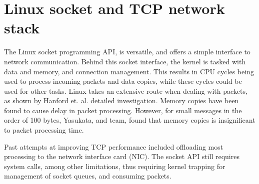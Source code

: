 \section[Linux scoket and TCP]{Linux socket and TCP network stack}\label{sec:linux-socket}
The Linux socket programming API, is versatile, and offers a simple interface to network communication.
Behind this socket interface, the kernel is tasked with data and memory, and connection management\cite{hanford2018survey,seth2009tcp}.
This results in CPU cycles being used to process incoming packets and data copies, while these cycles could be used for other tasks.
Linux takes an extensive route when dealing with packets, as shown by Hanford et. al. detailed investigation\cite{hanford2018survey}.
Memory copies have been found to cause delay in packet processing\cite{frey2009minimizing}.
However, for small messages in the order of 100 bytes, Yasukata, and team, found that memory copies is insignificant to packet processing time\cite{yasukata2016stackmap}.

Past attempts at improving TCP performance included offloading most processing to the network interface card (NIC)\cite{hanford2018survey}.
The socket API still requires system calls, among other limitations, thus requiring kernel trapping for management of socket queues, and consuming packets.

